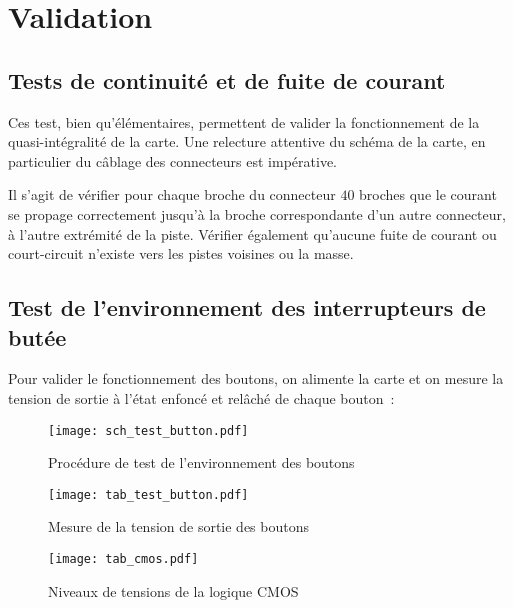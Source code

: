 \section{Validation}

\subsection{Tests de continuité et de fuite de courant}

Ces test, bien qu'élémentaires, permettent de valider la fonctionnement de la quasi-intégralité de la carte. Une relecture attentive du schéma de la carte, en particulier du câblage des connecteurs est impérative.

\vspace{1cm}

Il s'agit de vérifier pour chaque broche du connecteur $40$ broches que le courant se propage correctement jusqu'à la broche correspondante d'un autre connecteur, à l'autre extrémité de la piste. Vérifier également qu'aucune fuite de courant ou court-circuit n'existe vers les pistes voisines ou la masse.

\subsection{Test de l'environnement des interrupteurs de butée}

Pour valider le fonctionnement des boutons, on alimente la carte et on mesure la tension de sortie à l'état enfoncé et relâché de chaque bouton~:

\begin{figure}[H]
    \centering
    \texttt{[image: sch\_test\_button.pdf]}
    \decoRule
    \caption[
    Procédure de test de l'environnement des boutons]{
    Procédure de test de l'environnement des boutons}
    \label{fig:Procédure de test de l'environnement des boutons}
	\end{figure}

\begin{figure}[H]
    \centering
	\texttt{[image: tab\_test\_button.pdf]}
    \decoRule
    \caption[
    Mesure de la tension de sortie des boutons]{
    Mesure de la tension de sortie des boutons}
    \label{fig:Mesure de la tension de sortie des boutons}
	\end{figure}


\begin{figure}[H]
    \centering
	\texttt{[image: tab\_cmos.pdf]}
    \decoRule
    \caption[
    Niveaux de tensions de la logique CMOS]{
    Niveaux de tensions de la logique CMOS}
    \label{fig:Niveaux de tensions de la logique CMOS}
	\end{figure}

